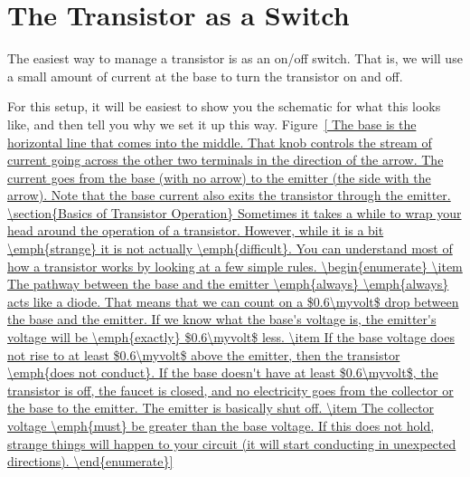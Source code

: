 \section{The Transistor as a Switch}

The easiest way to manage a transistor is as an on/off switch.
That is, we will use a small amount of current at the base to turn the transistor on and off.

For this setup, it will be easiest to show you the schematic for what this looks like, and then tell you why we set it up this way.
Figure~\ref{



The base is the horizontal line that comes into the middle.  


That knob controls the stream of current going across the other two terminals in the direction of the arrow.
The current goes from the base (with no arrow) to the emitter (the side with the arrow).
Note that the base current also exits the transistor through the emitter.

\section{Basics of Transistor Operation}

Sometimes it takes a while to wrap your head around the operation of a transistor.
However, while it is a bit \emph{strange} it is not actually \emph{difficult}.
You can understand most of how a transistor works by looking at a few simple rules.

\begin{enumerate}

\item The pathway between the base and the emitter \emph{always} \emph{always} acts like a diode.
That means that we can count on a $0.6\myvolt$ drop between the base and the emitter.
If we know what the base's voltage is, the emitter's voltage will be \emph{exactly} $0.6\myvolt$ less.

\item If the base voltage does not rise to at least $0.6\myvolt$ above the emitter, then the transistor \emph{does not conduct}.  If the base doesn't have at least $0.6\myvolt$, the transistor is off, the faucet is closed, and no electricity goes from the collector or the base to the emitter.
The emitter is basically shut off.

\item The collector voltage \emph{must} be greater than the base voltage.
If this does not hold, strange things will happen to your circuit (it will start conducting in unexpected directions).


\end{enumerate}}
